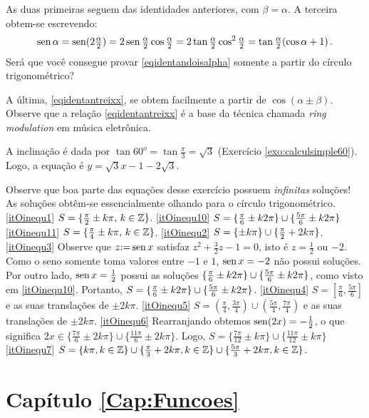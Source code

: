 \begin{Solution}{1.26}
As duas primeiras seguem das identidades anteriores, com $\beta=\alpha$.
A terceira obtem-se escrevendo:
$$
\operatorname{sen}\alpha=\operatorname{sen}(2\tfrac{\alpha}{2})=2\operatorname{sen}\tfrac{\alpha}{2}\cos\tfrac{\alpha}{2}=
2\tan\tfrac{\alpha}{2}\cos^2\tfrac{\alpha}{2}=\tan\tfrac{\alpha}{2}(\cos\alpha+1)\,.
$$
 Será que você consegue provar \eqref{eqidentandoisalpha} somente a partir do círculo
trigonométrico?

A última, \eqref{eqidentantreixx}, se obtem facilmente a partir de $\cos(\alpha\pm \beta)$. Observe que
a relação \eqref{eqidentantreixx} é a base da técnica chamada \emph{ring modulation} em música
eletrônica.
\end{Solution}
\begin{Solution}{1.27}
 A inclinação é dada por $\tan 60^o=\tan \frac{\pi}{3}=\sqrt{3}$ (Exercício
\ref{exo:calculsimple60}). Logo, a equação é $y=\sqrt{3}x-1-2\sqrt{3}$.
\end{Solution}
\begin{Solution}{1.28}
Observe que boa parte das equações desse exercício possuem \emph{infinitas} soluções!
As soluções obtêm-se essencialmente olhando para o círculo trigonométrico.
\eqref{itOinequ1} $S=\{\tfrac{\pi}{2}\pm k\pi,\,k\in \mathbb{Z}\}$.
\eqref{itOinequ10} $S=\{\tfrac{\pi}{6}\pm k2\pi\}\cup \{\tfrac{5\pi}{6}\pm k2\pi\}$
\eqref{itOinequ11} $S=\{\tfrac{\pi}{4}\pm k\pi,\,k\in \mathbb{Z}\}$.
\eqref{itOinequ2} $S=\{\pm k\pi\}\cup \{\tfrac{\pi}{2}+2k\pi\}$.
\eqref{itOinequ3}  Observe que $z{:=} \operatorname{sen} x$ satisfaz $z^2+\tfrac{3}{2}z-1=0$, isto é
$z=\tfrac{1}{2}$ ou $-2$. Como o seno somente toma valores entre $-1$ e $1$, $\operatorname{sen} x=-2$
não possui soluções. Por outro lado, $\operatorname{sen} x=\frac{1}{2}$ possui as soluções $\{\tfrac{\pi}{6}\pm
k2\pi\}\cup \{\tfrac{5\pi}{6}\pm k2\pi\}$, como visto em \eqref{itOinequ10}.
Portanto, $S=\{\tfrac{\pi}{6}\pm k2\pi\}\cup \{\tfrac{5\pi}{6}\pm k2\pi\}$.
\eqref{itOinequ4}  $S=[\tfrac{\pi}{6},\tfrac{5\pi}{6}]$ e as suas translações de $\pm
2k\pi$.
\eqref{itOinequ5}
$S=(\tfrac{\pi}{4},\tfrac{3\pi}{4})\cup(\tfrac{5\pi}{4},\tfrac{7\pi}{4})$ e as suas
translações de $\pm 2k\pi$.
 \eqref{itOinequ6} Rearranjando obtemos $\operatorname{sen} (2x)=-\tfrac12$, o que significa $2x\in
\{\frac{7\pi}{6}\pm 2k\pi\}\cup \{\frac{11\pi}{6}\pm 2k\pi\}$. Logo,
$S= \{\frac{7\pi}{12}\pm k\pi\}\cup \{\frac{11\pi}{12}\pm k\pi\}$
 \eqref{itOinequ7} $S=\{k\pi,k\in\mathbb{Z}\}\cup \{\tfrac{\pi}{3}+2k\pi,k\in\mathbb{Z}\}\cup
\{\tfrac{5\pi}{3}+2k\pi,k\in\mathbb{Z}\}$.
\end{Solution}
\protect \section *{Capítulo \ref {Cap:Funcoes}}
